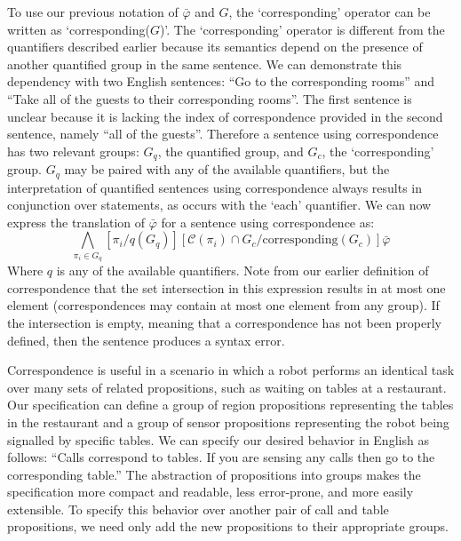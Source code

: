 To use our previous notation of $\bar{\varphi}$ and $G$, the `corresponding' operator can be written as `corresponding($G$)'. 
The `corresponding' operator is different from the quantifiers described earlier because its semantics depend on the presence of another quantified group in the same sentence. 
We can demonstrate this dependency with two English sentences: ``Go to the corresponding rooms'' and ``Take all of the guests to their corresponding rooms''.
The first sentence is unclear because it is lacking the index of correspondence provided in the second sentence, namely ``all of the guests''. 
Therefore a sentence using correspondence has two relevant groups: $G_q$, the quantified group, and $G_c$, the `corresponding' group. 
$G_q$ may be paired with any of the available quantifiers, but the interpretation of quantified sentences using correspondence always results in conjunction over statements, as occurs with the `each' quantifier. 
We can now express the translation of $\bar{\varphi}$ for a sentence using correspondence as:
\begin{equation*}
	\bigwedge \limits_{\pi_i \in G_q} [\pi_i / q(G_q)] [\mathcal{C}(\pi_i) \cap G_c / \text{corresponding}(G_c)] \bar{\varphi}
\end{equation*}
Where $q$ is any of the available quantifiers. 
Note from our earlier definition of correspondence that the set intersection in this expression results in at most one element (correspondences may contain at most one element from any group). 
If the intersection is empty, meaning that a correspondence has not been properly defined, then the sentence produces a syntax error. 

\begin{myExample}\label{Ex:corresponding}
	Correspondence is useful in a scenario in which a robot performs an identical task over many sets of related propositions, such as waiting on tables at a restaurant. 
	Our specification can define a group of region propositions representing the tables in the restaurant and a group of sensor propositions representing the robot being signalled by specific tables. We can specify our desired behavior in English as follows: 
	``Calls correspond to tables. 
	If you are sensing any calls then go to the corresponding table.''
	The abstraction of propositions into groups makes the specification more compact and readable, less error-prone, and more easily extensible. 
	To specify this behavior over another pair of call and table propositions, we need only add the new propositions to their appropriate groups. 
\end{myExample}
